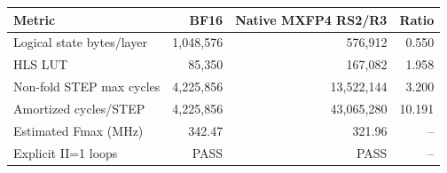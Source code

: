 \begin{tabular}{lrrr}
\toprule
Metric & BF16 & Native MXFP4 RS2/R3 & Ratio \\
\midrule
Logical state bytes/layer & 1{,}048{,}576 & 576{,}912 & 0.550 \\
HLS LUT & 85{,}350 & 167{,}082 & 1.958 \\
Non-fold STEP max cycles & 4{,}225{,}856 & 13{,}522{,}144 & 3.200 \\
Amortized cycles/STEP & 4{,}225{,}856 & 43{,}065{,}280 & 10.191 \\
Estimated Fmax (MHz) & 342.47 & 321.96 & -- \\
Explicit II=1 loops & PASS & PASS & -- \\
\bottomrule
\end{tabular}
